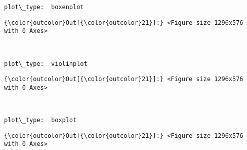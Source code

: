 \documentclass[11pt]{article}
\begin{document}
    \begin{Verbatim}[commandchars=\\\{\}]
plot\_type:  boxenplot

    \end{Verbatim}

\begin{Verbatim}[commandchars=\\\{\}]
{\color{outcolor}Out[{\color{outcolor}21}]:} <Figure size 1296x576 with 0 Axes>
\end{Verbatim}
            
    \begin{center}
    \end{center}
    { \hspace*{\fill} \\}
    
    \begin{Verbatim}[commandchars=\\\{\}]
plot\_type:  violinplot

    \end{Verbatim}

\begin{Verbatim}[commandchars=\\\{\}]
{\color{outcolor}Out[{\color{outcolor}21}]:} <Figure size 1296x576 with 0 Axes>
\end{Verbatim}
            
    \begin{center}
    \end{center}
    { \hspace*{\fill} \\}
    
    \begin{Verbatim}[commandchars=\\\{\}]
plot\_type:  boxplot

    \end{Verbatim}

\begin{Verbatim}[commandchars=\\\{\}]
{\color{outcolor}Out[{\color{outcolor}21}]:} <Figure size 1296x576 with 0 Axes>
\end{Verbatim}
            
    \begin{center}
    \end{center}
    { \hspace*{\fill} \\}
    
\end{document}
